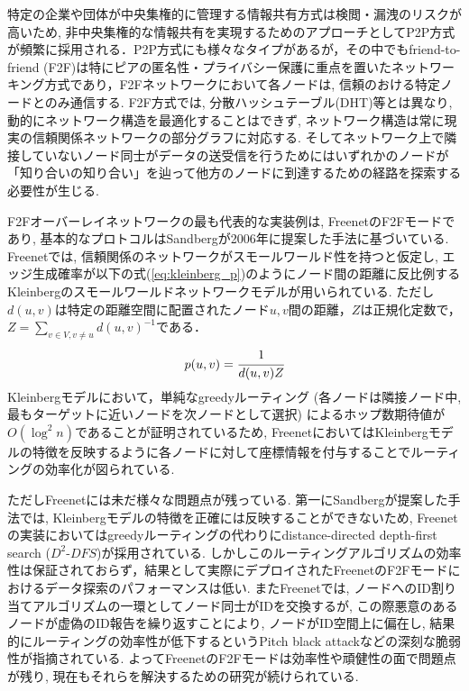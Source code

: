 \documentclass[technicalreport]{./ieicej-v3.0/UTF/ieicej}
\begin{document}
特定の企業や団体が中央集権的に管理する情報共有方式は検閲・漏洩のリスクが高いため, 非中央集権的な情報共有を実現するためのアプローチとしてP2P方式が頻繁に採用される．P2P方式にも様々なタイプがあるが，その中でもfriend-to-friend (F2F)\cite{bricklin2000friend}は特にピアの匿名性・プライバシー保護に重点を置いたネットワーキング方式であり，F2Fネットワークにおいて各ノードは, 信頼のおける特定ノードとのみ通信する. F2F方式では, 分散ハッシュテーブル(DHT)等とは異なり, 動的にネットワーク構造を最適化することはできず, ネットワーク構造は常に現実の信頼関係ネットワークの部分グラフに対応する. そしてネットワーク上で隣接していないノード同士がデータの送受信を行うためにはいずれかのノードが「知り合いの知り合い」を辿って他方のノードに到達するための経路を探索する必要性が生じる\cite{rogers2007disappear,roos2016analyzing}.

F2Fオーバーレイネットワークの最も代表的な実装例は, Freenet\cite{clarke2001freenet}のF2Fモード\cite{clarke2010private}であり, 基本的なプロトコルはSandbergが2006年に提案した手法\cite{sandberg2006distributed}に基づいている. Freenetでは, 信頼関係のネットワークがスモールワールド性を持つと仮定し, エッジ生成確率が以下の式(\ref{eq:kleinberg_p})のようにノード間の距離に反比例するKleinbergのスモールワールドネットワークモデル\cite{kleinberg2000small}が用いられている. ただし$d(u,v)$は特定の距離空間に配置されたノード$u,v$間の距離，$Z$は正規化定数で，$Z = \displaystyle \sum_{v\in V, v\neq u}^{}d(u,v)^{-1}$である．
\begin{eqnarray}
 p(u,v)=\cfrac{1}{d(u,v)Z} \label{eq:kleinberg_p}
\end{eqnarray}
Kleinbergモデルにおいて，単純なgreedyルーティング (各ノードは隣接ノード中, 最もターゲットに近いノードを次ノードとして選択) によるホップ数期待値が$O(\log^2 n)$であることが証明されているため, FreenetにおいてはKleinbergモデルの特徴を反映するように各ノードに対して座標情報を付与することでルーティングの効率化が図られている. 

ただしFreenetには未だ様々な問題点が残っている. 第一にSandbergが提案した手法では, Kleinbergモデルの特徴を正確には反映することができないため, Freenetの実装においてはgreedyルーティングの代わりにdistance-directed depth-first search ($D^2$-$DFS$)が採用されている. しかしこのルーティングアルゴリズムの効率性は保証されておらず，結果として実際にデプロイされたFreenetのF2Fモードにおけるデータ探索のパフォーマンスは低い. またFreenetでは, ノードへのID割り当てアルゴリズムの一環としてノード同士がIDを交換するが, この際悪意のあるノードが虚偽のID報告を繰り返すことにより, ノードがID空間上に偏在し, 結果的にルーティングの効率性が低下するというPitch black attack\cite{evans2007routing}などの深刻な脆弱性が指摘されている. よってFreenetのF2Fモードは効率性や頑健性の面で問題点が残り, 現在もそれらを解決するための研究が続けられている.
\end{document}

